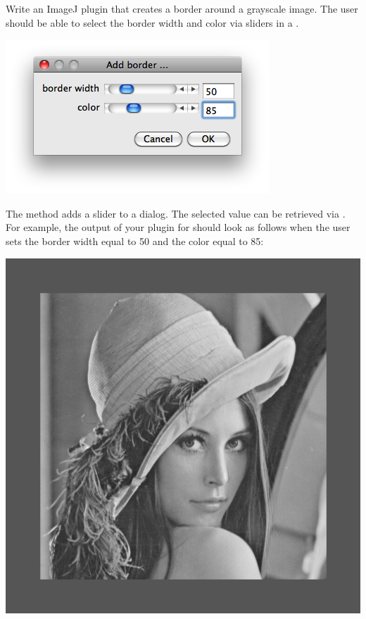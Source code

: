 \documentclass{book}
\begin{document}
\begin{exercise}\label{ex:border}
Write an ImageJ plugin that creates a border around a grayscale image. The user should be able to select the border width and color via sliders in a . 

\begin{center}
\includegraphics[scale=0.5]{sliders.png}
\end{center}

The method  adds a slider to a dialog. The selected value can be retrieved via . For example, the output of your plugin for  should look as follows when the user sets the border width equal to 50 and the color equal to 85:
 
\begin{center}
\includegraphics[scale=0.2]{lena-border.png}
\end{center}
\end{exercise}
\end{document}
